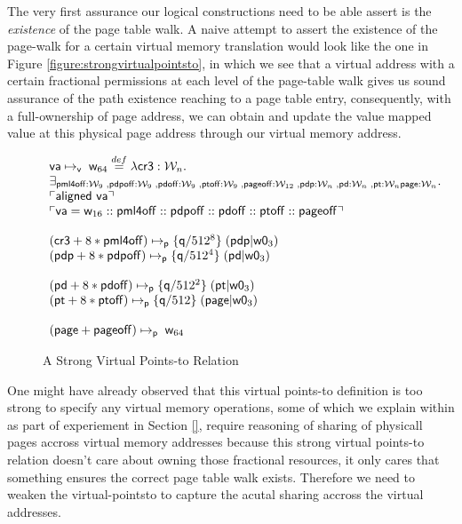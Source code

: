 The very first assurance our logical constructions need to be able assert is the \textit{existence} of the page table walk. A naive attempt to assert the existence of the page-walk for a certain virtual memory translation would look like the one in Figure \ref{figure:strongvirtualpointsto}, in which we see that a virtual address with a certain fractional permissions at each level of the page-table walk gives us sound assurance of the path existence reaching to a page table entry, consequently, with a full-ownership of page address, we can obtain and update the value mapped value at this physical page address through our virtual memory address. 
\begin{figure*}
\[
\begin{array}{l}
  \mathsf{va}\mapsto_{\mathsf{v}}\;\mathsf{w}_{64} \stackrel{def}{=} \lambda \mathsf{cr3}:\mathcal{W}_n.\\
  \exists_{\mathsf{pml4off}:\mathcal{W}_{9} \;, \mathsf{pdpoff}:\mathcal{W}_{9} \;, \mathsf{pdoff}:\mathcal{W}_{9} \;,\mathsf{ptoff}:\mathcal{W}_{9} \;, \mathsf{pageoff}:\mathcal{W}_{12} \;, \mathsf{pdp}:\mathcal{W}_n \;, \mathsf{pd}:\mathcal{W}_n \;, \mathsf{pt}:\mathcal{W}_n \mathsf{page}:\mathcal{W}_n} \ldotp \\
  \ulcorner \textsf{aligned } \mathsf{va} \urcorner \\ 
   \ulcorner \mathsf{va} = \mathsf{w}_{16} :: \mathsf{pml4off} :: \mathsf{pdpoff} :: 
   \mathsf{pdoff} :: \mathsf{ptoff} :: \mathsf{pageoff} \urcorner \\\\
  (\mathsf{cr3}+8*\mathsf{pml4off})\mapsto_{\mathsf{p}}\{\mathsf{q}/512^{8}\}\;(\mathsf{pdp} | \mathsf{w0}_{3}) \\ 
  (\mathsf{pdp}+8*\mathsf{pdpoff})\mapsto_{\mathsf{p}}\{\mathsf{q}/512^{4}\}\;(\mathsf{pd} | \mathsf{w0}_{3}) \\ \\
  (\mathsf{pd}+8*\mathsf{pdoff})\mapsto_{\mathsf{p}}\{\mathsf{q}/512^{2}\}\;(\mathsf{pt} | \mathsf{w0}_{3}) \\ 
  (\mathsf{pt}+8*\mathsf{ptoff})\mapsto_{\mathsf{p}}\{\mathsf{q}/512\}\;(\mathsf{page} | \mathsf{w0}_{3}) \\ \\
  (\mathsf{page}+\mathsf{pageoff})\mapsto_{\mathsf{p}}\;\mathsf{w}_{64} 
\end{array}
\]
\caption{A Strong Virtual Points-to Relation}
  \label{fig:strongvirtualpointsto}
\end{figure*}
One might have already observed that this virtual points-to definition is too strong to specify any virtual memory operations, some of which we explain within as part of experiement in Section \ref{}, require reasoning of sharing of physicall pages accross virtual memory addresses because this strong virtual points-to relation doesn’t care about owning those fractional resources, it only cares that something ensures the correct page table walk exists. Therefore we need to weaken the virtual-pointsto to capture the acutal sharing accross the virtual addresses. 

